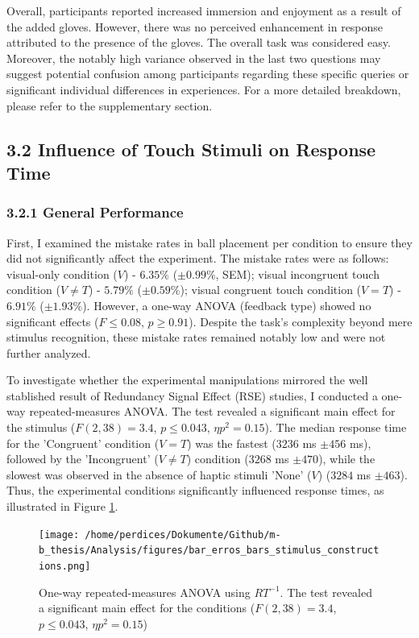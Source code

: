 \documentclass[12pt,oneside,openright]{report}
\begin{document}
Overall, participants reported increased immersion and enjoyment as a result of the added gloves. However, there was no perceived enhancement in response attributed to the presence of the gloves. The overall task was considered easy. Moreover, the notably high variance observed in the last two questions may suggest potential confusion among participants regarding these specific queries or significant individual differences in experiences. For a more detailed breakdown, please refer to the supplementary section.
    
\subsection*{3.2 Influence of Touch Stimuli on Response Time}
\subsubsection*{3.2.1 General Performance}

First, I examined the mistake rates in ball placement per condition to ensure they did not significantly affect the experiment. The mistake rates were as follows: visual-only condition ($V$) - $6.35\%$ ($\pm 0.99\%$, SEM); visual incongruent touch condition ($V \neq T$) - $5.79\%$ ($\pm 0.59\%$); visual congruent touch condition ($V=T$) - $6.91\%$ ($\pm 1.93\%$). However, a one-way ANOVA (feedback type) showed no significant effects ($ F \leq 0.08$, $p \geq 0.91$). Despite the task's complexity beyond mere stimulus recognition, these mistake rates remained notably low and were not further analyzed.

To investigate whether the experimental manipulations mirrored the well stablished result of Redundancy Signal Effect (RSE) studies, I conducted a one-way repeated-measures ANOVA. The test revealed a significant main effect for the stimulus ($F(2,38) = 3.4$, $p \leq 0.043$, $\eta p^2 = 0.15$). The median response time for the 'Congruent' condition ($V=T$) was the fastest ($3236$ ms $\pm 456$ ms), followed by the 'Incongruent' ($V \neq T$) condition ($3268$ ms $\pm 470$), while the slowest was observed in the absence of haptic stimuli 'None' ($V$) ($3284$ ms $\pm 463$). Thus, the experimental conditions significantly influenced response times, as illustrated in Figure \ref{fig:error}.

\begin{figure}[!ht]
    \centering
    \texttt{[image: /home/perdices/Dokumente/Github/m-b\_thesis/Analysis/figures/bar\_erros\_bars\_stimulus\_constructions.png]}
    \caption{One-way repeated-measures ANOVA using $RT^{-1}$. The test revealed a significant main effect for the conditions ($F(2,38) = 3.4$, $p \leq 0.043$, $\eta p^2 = 0.15$)}
    \label{fig:error}
\end{figure}
\end{document}
